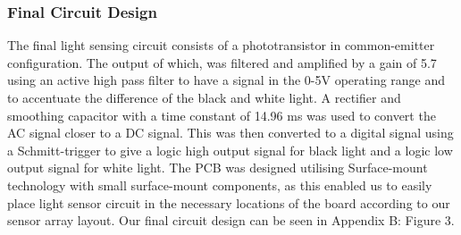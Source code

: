\subsubsection*{Final Circuit Design}
The final light sensing circuit  consists of a phototransistor in common-emitter configuration. The output of which, was filtered and amplified by a gain of 5.7 using an active high pass filter to have a signal in the 0-5V operating range and to accentuate the difference of the black and white light. A rectifier and smoothing capacitor with a time constant of 14.96 ms was used to convert the AC signal closer to a DC signal. This was then converted to a digital signal using a Schmitt-trigger to give a logic high output signal for black light and a logic low output signal for white light. The PCB was designed utilising Surface-mount technology with small surface-mount components, as this enabled us to easily place light sensor circuit in the necessary locations of the board according to our sensor array layout. Our final circuit design can be seen in Appendix B: Figure 3.